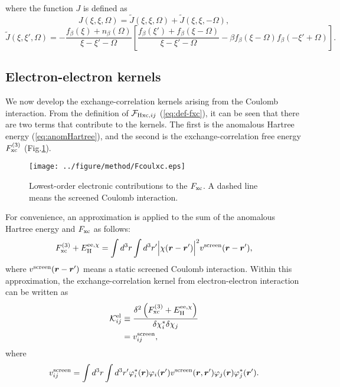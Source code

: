 %
where the function $J$ is defined as
%
\begin{equation}
	J(\xi, \xi, \Omega) = \tilde{J}(\xi, \xi, \Omega) + \tilde{J}(\xi, \xi, -\Omega), 
	\label{eq:Jfunc}
\end{equation}
%
\begin{equation}
	\tilde{J}(\xi, \xi', \Omega) = 
	- \frac{f_\beta(\xi) + n_\beta(\Omega)}{\xi-\xi'-\Omega}
	\left[
		\frac{f_\beta(\xi') + f_\beta(\xi-\Omega)}{\xi-\xi'-\Omega} -
		\beta f_\beta(\xi-\Omega) f_\beta(-\xi'+\Omega)
	\right].
	\label{eq:Jtildefunc}
\end{equation}
%
%
\subsection*{Electron-electron kernels}
%
We now develop the exchange-correlation kernels arising from the Coulomb interaction.
From the definition of ${\mathcal F}_{{\rm Hxc},ij}$ (\ref{eq:def-fxc}), it can be seen that
there are two terms that contribute to the kernels. The first is the anomalous Hartree energy (\ref{eq:anomHartree}), 
and the second is the exchange-correlation free energy $F^{(3)}_{\rm xc}$ (Fig.\ref{fig:Fcoulxc}).
%
\begin{figure} %
	\centering
	\texttt{[image: ../figure/method/Fcoulxc.eps]}
	\caption{Lowest-order electronic contributions to the $F_{\rm xc}$. A dashed line means the screened Coulomb interaction.}
	\label{fig:Fcoulxc}
\end{figure}
%
For convenience, an approximation is applied to the sum of the anomalous Hartree energy and $F_{\rm xc}$ 
as follows\cite{Luders2005_1}:
%
\begin{equation}
	F^{(3)}_{\rm xc} + E^{{\rm ee}, \chi}_{\rm H} = \int d^3r \int d^3r'
	\Big| \chi(\bm r - \bm r') \Big|^2 v^{\rm screen}(\bm r - \bm r'),
	\label{Fcoulxcapprox}
\end{equation}
%
where $v^{\rm screen}(\bm r - \bm r')$ means a static screened Coulomb interaction.
Within this approximation, the exchange-correlation kernel from electron-electron interaction
can be written as
%
\begin{equation}
	\label{eq:Kel}
\begin{split}
	{\mathcal K}^{\rm el}_{ij} &\equiv \frac{\delta^2 \left( F^{(3)}_{\rm xc} + E^{{\rm ee},\chi}_{\rm H} \right)}
	{\delta \chi^\ast_i \delta\chi_j} \\
	& = v^{\rm screen}_{ij},
\end{split}
\end{equation}
%
where
%
\begin{equation}
	v^{\rm screen}_{ij} = \int d^3r \int d^3r' \varphi^\ast_i(\bm r)\varphi_i({\bm r'})
	v^{\rm screen}(\bm r, {\bm r'}) \varphi_j(\bm r) \varphi^\ast_j({\bm r'}).
	\label{eq:Keldef}
\end{equation}
%

